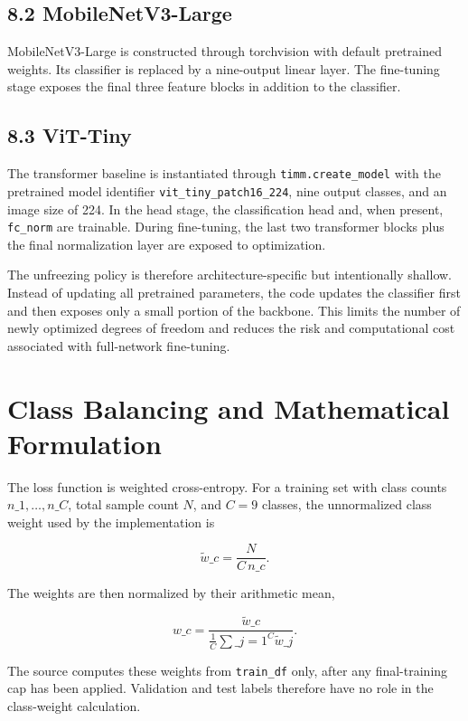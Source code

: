 \documentclass[11pt,a4paper]{article}
\begin{document}
\subsection{8.2 MobileNetV3-Large}
MobileNetV3-Large is constructed through torchvision with default pretrained weights. Its classifier is replaced by a nine-output linear layer. The fine-tuning stage exposes the final three feature blocks in addition to the classifier.

\subsection{8.3 ViT-Tiny}
The transformer baseline is instantiated through \texttt{timm.create\_model} with the pretrained model identifier \texttt{vit\_tiny\_patch16\_224}, nine output classes, and an image size of 224. In the head stage, the classification head and, when present, \texttt{fc\_norm} are trainable. During fine-tuning, the last two transformer blocks plus the final normalization layer are exposed to optimization.

The unfreezing policy is therefore architecture-specific but intentionally shallow. Instead of updating all pretrained parameters, the code updates the classifier first and then exposes only a small portion of the backbone. This limits the number of newly optimized degrees of freedom and reduces the risk and computational cost associated with full-network fine-tuning.

\section{Class Balancing and Mathematical Formulation}
The loss function is weighted cross-entropy. For a training set with class counts $n\_1,\ldots,n\_C$, total sample count $N$, and $C=9$ classes, the unnormalized class weight used by the implementation is

\begin{equation}
\tilde{w}\_c = \frac{N}{C\,n\_c}.
\end{equation}

The weights are then normalized by their arithmetic mean,

\begin{equation}
w\_c = \frac{\tilde{w}\_c}{\frac{1}{C}\sum\_{j=1}^{C}\tilde{w}\_j}.
\end{equation}

The source computes these weights from \texttt{train\_df} only, after any final-training cap has been applied. Validation and test labels therefore have no role in the class-weight calculation.
\end{document}
